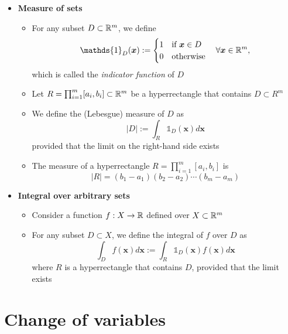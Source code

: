 \documentclass[12pt,a4paper]{article}
\begin{document}
\begin{itemize}
\item \textbf{Measure of sets}
  \begin{itemize}
  \item For any subset $D\subset \mathbb{R}^{m}$, we define
    \begin{equation}\nonumber%
      \mathds{1}_{D}(\bm{x}) :=
      \begin{cases}
        1 & \text{if $\bm{x}\in D$} \\
        0 & \text{otherwise} \\
      \end{cases}
      \quad \forall \bm{x} \in \R^{m},
    \end{equation}
    which is called the \emph{indicator function} of $D$
  \item Let $R=\prod_{i=1}^{m}[a_{i},b_{i}]\subset \mathbb{R}^{m}$ be a hyperrectangle that contains $D\subset R^{m}$
  \item We define the (Lebesgue) measure of $D$ as
    \begin{equation}\nonumber%
      |D|:=\int_{R}\mathds{1}_{D}(\bm{x})d\bm{x}
    \end{equation}
    provided that the limit on the right-hand side exists
  \item The measure of a hyperrectangle $R=\prod_{i=1}^{m}[a_{i},b_{i}]$ is
    \begin{equation}\nonumber%
      |R|
      = (b_{1}-a_{1})(b_{2}-a_{2})\cdots(b_{m}-a_{m})
    \end{equation}
  \end{itemize}

\item \textbf{Integral over arbitrary sets}
  \begin{itemize}
  \item Consider a function $f:X \to \mathbb{R}$ defined over $X\subset \mathbb{R}^{m}$
  \item For any subset $D\subset X$, 
    we define the integral of $f$ over $D$ as
    \begin{equation}\nonumber%
      \int_{D}f(\bm{x})d\bm{x} := \int_{R}\mathds{1}_{D}(\bm{x})f(\bm{x})d\bm{x}
    \end{equation}
    where $R$ is a hyperrectangle that contains $D$, provided that the limit exists
  \end{itemize}

\end{itemize}

\section{Change of variables}
\end{document}
